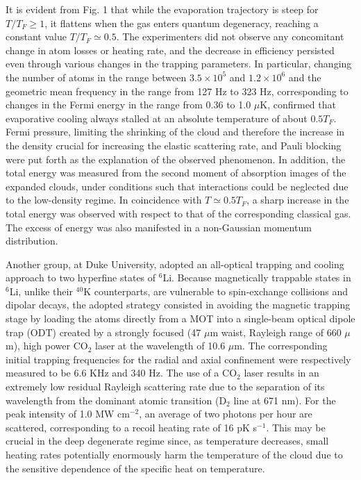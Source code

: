 \documentclass[pra,letterpaper,twocolumn,showpacs,superscriptaddress]{revtex4}
\begin{document}
It is evident from Fig. 1 that while the evaporation trajectory is steep for $T/T_F \geq 1$, it flattens when the gas enters quantum degeneracy, 
reaching a constant value $T/T_F \simeq 0.5$. The experimenters did not observe any concomitant change in atom losses or heating rate, and 
the decrease in efficiency persisted even through various changes in the trapping parameters. In particular, changing the number of atoms in the 
range between $3.5 \times 10^5$ and $1.2 \times 10^6$ and the geometric mean frequency in the range from 127 Hz to 323 Hz, corresponding to changes 
in the Fermi energy in the range from 0.36 to 1.0 $\mu$K, confirmed that evaporative cooling always stalled at an absolute temperature of about $0.5 T_F$. 
Fermi pressure, limiting the shrinking of the cloud and therefore the increase in the density crucial for increasing the elastic scattering 
rate, and Pauli blocking were put forth as the explanation of the observed phenomenon. 
In addition, the total energy was measured from the second moment of absorption images of the expanded clouds, under conditions such that interactions 
could be neglected due to the low-density regime. In coincidence with $T \simeq 0.5 T_F$, a sharp increase in the total energy was observed with respect 
to that of the corresponding classical gas. The excess of energy was also manifested in a non-Gaussian momentum distribution. 

Another group, at Duke University, adopted an all-optical trapping and cooling approach to two 
hyperfine states of ${}^6$Li. Because magnetically trappable states in ${}^6$Li, unlike their ${}^{40}$K counterparts,
are vulnerable to spin-exchange collisions and dipolar decays, the adopted strategy consisted in avoiding the magnetic 
trapping stage by loading the atoms directly from a MOT into a single-beam optical dipole trap (ODT) created by a strongly 
focused (47 $\mu$m waist, Rayleigh range of 660 $\mu$m), high power CO${}_2$ laser at the wavelength of 10.6 $\mu$m. 
The corresponding initial trapping frequencies for the radial and axial confinement were respectively measured to be 6.6 KHz and 340 Hz. 
The use of a CO${}_2$ laser results in an extremely low residual Rayleigh scattering rate due to the separation of its wavelength from 
the dominant atomic transition (D${}_2$ line at 671 nm). For the peak intensity of 1.0 MW cm${}^{-2}$, an average of two photons per hour 
are scattered, corresponding to a recoil heating rate of 16 pK s${}^{-1}$. This may be crucial in the deep degenerate 
regime since, as temperature  decreases, small heating rates potentially enormously harm the 
temperature of the cloud due to the sensitive dependence of the specific heat on temperature.
\end{document}
